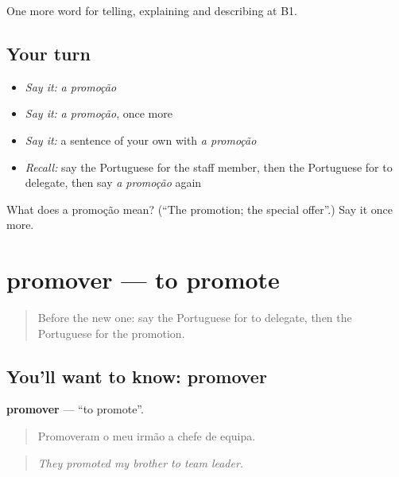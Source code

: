 \begin{grammarlens}[title={What you've built}]
One more word for telling, explaining and describing at B1.
\end{grammarlens}

\subsection*{Your turn}
\begin{itemize}
\raggedright
  \item \emph{Say it:} \emph{a promoção}
  \item \emph{Say it:} \emph{a promoção}, once more
  \item \emph{Say it:} a sentence of your own with \emph{a promoção}
  \item \emph{Recall:} say the Portuguese for the staff member, then the Portuguese for to delegate, then say \emph{a promoção} again
\end{itemize}

\begin{tcolorbox}[breakable,colback=teal!4,colframe=teal!35!black,title={Before you move on}]
What does a promoção mean? (\textquotedblleft{}The promotion; the special offer\textquotedblright{}.) Say it once more.
\end{tcolorbox}
\section[promover]{promover — to promote}

\label{lesson:PT-C360-promover}



\begin{quote}
Before the new one: say the Portuguese for to delegate, then the Portuguese for the promotion.
\end{quote}

\subsection*{You'll want to know: promover}
\textbf{promover} — \textquotedblleft{}to promote\textquotedblright{}.

\begin{quote}
Promoveram o meu irmão a chefe de equipa.
\end{quote}

\begin{quote}
\emph{They promoted my brother to team leader.}
\end{quote}

